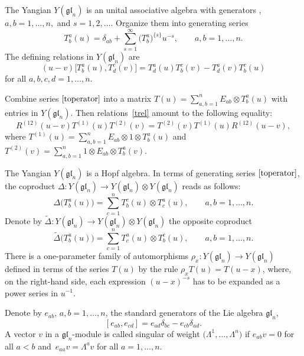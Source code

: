 \documentclass[10pt,a4paper]{amsart}
\numberwithin{equation}{section}
\begin{document}
The Yangian $Y(\mathfrak{g l}_{n})$ is an unital associative algebra with generators , $a, b=1, \dots, n, $ and $s=1,2, \dots$. Organize them into generating series
\begin{equation}\label{toperator} T^a_b(u)=\delta_{ab}+\sum_{s=1}^{\infty} \bigl(T^a_b\bigr)^{\{s\}} u^{-s}, \qquad a, b=1, \dots, n.\end{equation}
The defining relations in $Y(\mathfrak{g l}_{n})$ are
\begin{equation} (u-v)\bigl[T^a_b(u), T^c_d(v)\bigr]=T^a_d(u)T^c_b(v) -T^a_d(v)T^c_b(u) \label{trel}\end{equation}
for all $a, b, c, d=1, \dots, n$.

Combine series $\eqref{toperator}$ into a matrix $T(u)=\sum_{a, b=1}^{n} E_{a b} \otimes T_{ b}^a(u)$ with entries in $ Y(\mathfrak{g l}_{n})$. Then relations~\eqref{trel} amount to the following equality:
\begin{equation*}
R^{(12)}(u-v) T^{(1)}(u) T^{(2)}(v)=T^{(2)}(v) T^{(1)}(u) R^{(12)}(u-v),
\end{equation*}
where $T^{(1)}(u)=\sum_{a, b=1}^{n} E_{a b}\otimes 1 \otimes T_{ b}^a(u)$ and $T^{(2)}(v)=\sum_{a, b=1}^{n} 1 \otimes E_{a b}\otimes T_{ b}^a(v)$.

The Yangian $Y(\mathfrak{g l}_{n})$ is a Hopf algebra. In terms of generating series $\eqref{toperator}$, the coproduct $\Delta\colon Y(\mathfrak{g l}_{n}) \rightarrow Y(\mathfrak{g l}_{n}) \otimes Y(\mathfrak{g l}_{n})$ reads as follows:
\begin{equation}\label{coproduct}
\Delta\bigl(T_{ b}^a(u)\bigr)=\sum_{c=1}^{n} T^c_{ b}(u) \otimes T^a_{ c}(u), \qquad a, b=1, \dots, n.
\end{equation}
Denote by $\widetilde{\Delta}\colon Y(\mathfrak{g l}_{n}) \rightarrow Y(\mathfrak{g l}_{n}) \otimes Y(\mathfrak{g l}_{n})$ the opposite coproduct
\begin{equation}\label{opcoproduct}
\widetilde{\Delta}\bigl(T_{ b}^a(u)\bigr)=\sum_{c=1}^nT^a_c(u)\otimes T^c_b(u), \qquad a, b=1, \dots, n.
\end{equation}
There is a one-parameter family of automorphisms $\rho_x\colon Y(\mathfrak{gl}_n) \rightarrow Y(\mathfrak{gl}_n)$ defined in terms of the series $T(u)$ by the rule $\rho_x T(u)= T(u-x)$, where, on the right-hand side, each expression $(u-x)^{-s}$ has to be expanded as a power series in $u^{-1}$.

Denote by $e_{ab}$, $a,b=1,\dots,n$, the standard generators of the Lie algebra $\mathfrak{gl}_n$,
\begin{equation}\label{eijkl}
[e_{ab},e_{cd}]=e_{ad} \delta_{bc}-e_{cb} \delta_{ad}.
\end{equation}
A vector $v$ in a $\mathfrak{gl}_n$-module is called
singular of weight $\bigl(\Lambda^1,\dots,\Lambda^n\bigr)$ if $e_{ab}v = 0$ for all $a<b$ and~${e_{aa}v=\Lambda^av}$ for all $a=1,\dots,n$.
\end{document}
